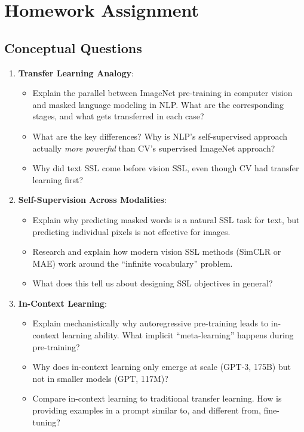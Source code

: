\documentclass{article}
\begin{document}
\section{Homework Assignment}

\subsection{Conceptual Questions}

\begin{enumerate}
\item \textbf{Transfer Learning Analogy}:
\begin{itemize}
\item Explain the parallel between ImageNet pre-training in computer vision and masked language modeling in NLP. What are the corresponding stages, and what gets transferred in each case?
\item What are the key differences? Why is NLP's self-supervised approach actually \textit{more powerful} than CV's supervised ImageNet approach?
\item Why did text SSL come before vision SSL, even though CV had transfer learning first?
\end{itemize}

\item \textbf{Self-Supervision Across Modalities}:
\begin{itemize}
\item Explain why predicting masked words is a natural SSL task for text, but predicting individual pixels is not effective for images.
\item Research and explain how modern vision SSL methods (SimCLR or MAE) work around the ``infinite vocabulary'' problem.
\item What does this tell us about designing SSL objectives in general?
\end{itemize}

\item \textbf{In-Context Learning}:
\begin{itemize}
\item Explain mechanistically why autoregressive pre-training leads to in-context learning ability. What implicit ``meta-learning'' happens during pre-training?
\item Why does in-context learning only emerge at scale (GPT-3, 175B) but not in smaller models (GPT, 117M)?
\item Compare in-context learning to traditional transfer learning. How is providing examples in a prompt similar to, and different from, fine-tuning?
\end{itemize}


\end{enumerate}
\end{document}
